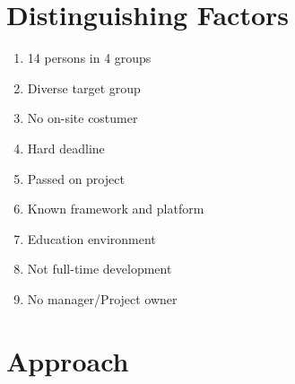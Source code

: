 \documentclass{article}
\begin{document}
\section{Distinguishing Factors}
\begin{enumerate}
	\item 14 persons in 4 groups
	\item Diverse target group
	\item No on-site costumer
	\item Hard deadline
	\item Passed on project
	\item Known framework and platform
	\item Education environment
	\item Not full-time development
	\item No manager/Project owner
\end{enumerate}

\section{Approach}
\end{document}
